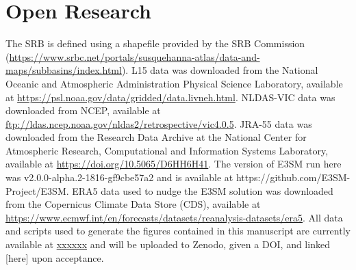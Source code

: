 \documentclass[draft]{agujournal2019}
\begin{document}
%
%

%

%


\section{Open Research}

The SRB is defined using a shapefile provided by the SRB Commission (\url{https://www.srbc.net/portals/susquehanna-atlas/data-and-maps/subbasins/index.html}). L15 data was downloaded from the National Oceanic and Atmospheric Administration Physical Science Laboratory, available at \url{https://psl.noaa.gov/data/gridded/data.livneh.html}. NLDAS-VIC data was downloaded from NCEP, available at \url{ftp://ldas.ncep.noaa.gov/nldas2/retrospective/vic4.0.5}. JRA-55 data was downloaded from the Research Data Archive at the National Center for Atmospheric Research, Computational and Information Systems Laboratory, available at \url{https://doi.org/10.5065/D6HH6H41}. The version of E3SM run here was v2.0.0-alpha.2-1816-gf9cbe57a2 and is available at https://github.com/E3SM-Project/E3SM. ERA5 data used to nudge the E3SM solution was downloaded from the Copernicus Climate Data Store (CDS), available at \url{https://www.ecmwf.int/en/forecasts/datasets/reanalysis-datasets/era5}. All data and scripts used to generate the figures contained in this manuscript are currently available at \url{xxxxxx} and will be uploaded to Zenodo, given a DOI, and linked [here] upon acceptance.
\end{document}
